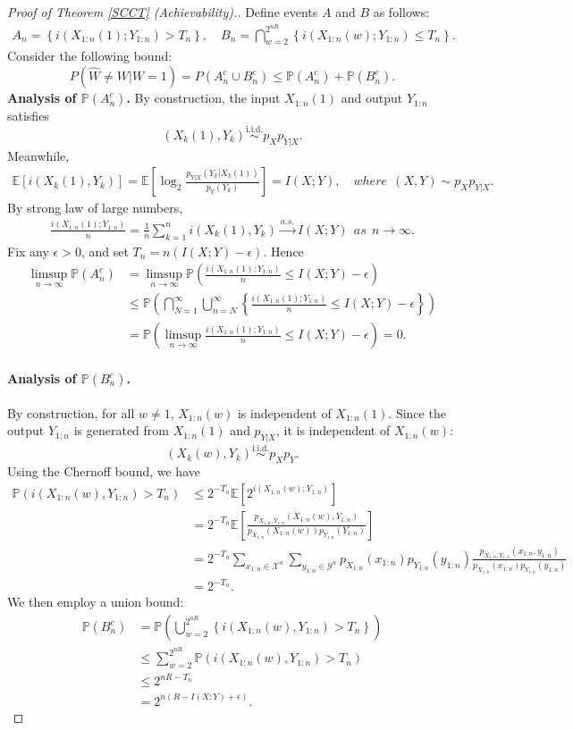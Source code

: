 \documentclass{article}
\numberwithin{equation}{section}
\newcommand{\E}{\mathbb{E}}
\newcommand{\bbP}{\mathbb{P}}
\renewcommand{\cal}{\mathcal}
\newcommand{\wh}{\widehat}
\theoremstyle{plain}
\theoremstyle{definition}
\begin{document}
\begin{proof}[Proof of Theorem \ref{SCCT} (Achievability).]
Define events $A$ and $B$ as follows:
\begin{align*}
	A_n=\left\{i(X_{1:n}(1);Y_{1:n})>T_n\right\},\quad B_n=\bigcap_{w=2}^{2^{nR}}\left\{i(X_{1:n}(w);Y_{1:n})\leq T_n\right\}.
\end{align*}
Consider the following bound: $$P(\wh{W}\neq W|W=1)=P(A_n^c\cup B_n^c)\leq\bbP(A_n^c)+\bbP(B_n^c).$$
\textbf{Analysis of $\bbP(A_n^c)$.}  By construction, the input $X_{1:n}(1)$ and output $Y_{1:n}$ satisfies 
$$(X_k(1),Y_k)\overset{\mathrm{i.i.d.}}{\sim} p_Xp_{Y|X}.$$
Meanwhile,
\begin{align*}
	\E\left[i(X_k(1),Y_k)\right]=\E\left[\log_2\frac{p_{Y|X}(Y_k|X_k(1))}{p_Y(Y_k)}\right]=I(X;Y),\quad where\ \ (X,Y)\sim p_Xp_{Y|X}.
\end{align*}
By strong law of large numbers,
\begin{align*}
	\frac{i(X_{1:n}(1);Y_{1:n})}{n}=\frac{1}{n}\sum_{k=1}^n i(X_k(1),Y_k)\overset{a.s.}{\to} I(X;Y)\ \ as\ \ n\to\infty.
\end{align*}
Fix any $\epsilon>0$, and set $T_n=n(I(X;Y)-\epsilon)$. Hence
\begin{align*}
	\limsup_{n\to\infty}\bbP(A_n^c)&=\limsup_{n\to\infty}\bbP\left(\frac{i(X_{1:n}(1);Y_{1:n})}{n}\leq I(X;Y)-\epsilon\right)\\
	&\leq\bbP\left(\bigcap_{N=1}^\infty\bigcup_{n=N}^\infty\left\{\frac{i(X_{1:n}(1);Y_{1:n})}{n}\leq I(X;Y)-\epsilon\right\}\right)\\
	&=\bbP\left(\limsup_{n\to\infty}\frac{i(X_{1:n}(1);Y_{1:n})}{n}\leq I(X;Y)-\epsilon\right)=0.
\end{align*}
\paragraph{Analysis of $\bbP(B_n^c)$.} By construction, for all $w\neq 1$, $X_{1:n}(w)$ is independent of $X_{1:n}(1)$.  Since the output $Y_{1:n}$ is generated from $X_{1:n}(1)$ and $p_{Y|X}$, it is independent of $X_{1:n}(w)$:
$$(X_k(w),Y_k)\overset{\mathrm{i.i.d.}}{\sim} p_Xp_Y.$$
Using the Chernoff bound, we have
\begin{align*}
	\bbP\left(i(X_{1:n}(w),Y_{1:n})>T_n\right)&\leq 2^{-T_n}\E\left[2^{i(X_{1:n}(w);Y_{1:n})}\right]\\
	&=2^{-T_n}\E\left[\frac{p_{X_{1:n},Y_{1:n}}(X_{1:n}(w),Y_{1:n})}{p_{X_{1:n}}(X_{1:n}(w))p_{Y_{1:n}}(Y_{1:n})}\right]\\
	&=2^{-T_n}\sum_{x_{1:n}\in\cal{X}^n}\sum_{y_{1:n}\in\cal{Y}^n}p_{X_{1:n}}(x_{1:n})p_{Y_{1:n}}(y_{1:n})\frac{p_{X_{1:n},Y_{1:n}}(x_{1:n},y_{1:n})}{p_{X_{1:n}}(x_{1:n})p_{Y_{1:n}}(y_{1:n})}\\
	&=2^{-T_n}.
\end{align*}
We then employ a union bound:
\begin{align*}
	\bbP(B_n^c)&=\bbP\left(\bigcup_{w=2}^{2^{nR}}\left\{i(X_{1:n}(w),Y_{1:n})>T_n\right\}\right)\\
	&\leq\sum_{w=2}^{2^{nR}}\bbP\left(i(X_{1:n}(w),Y_{1:n})>T_n\right)\\
	&\leq2^{nR-T_n}\\
	&=2^{n(R-I(X;Y)+\epsilon)}.
\end{align*}

\end{proof}
\end{document}
